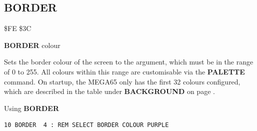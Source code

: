 
\newpage
\subsection{BORDER}
\begin{description}[leftmargin=2cm,style=nextline]
\item [Token:] \$FE \$3C
\item [Format:] {\bf BORDER} colour
\item [Usage:] Sets the border colour
               of the screen to the argument, which must be in the
               range of 0 to 255. All colours within this range are
               customisable via the {\bf PALETTE} command. On
               startup, the MEGA65 only has the first 32 colours configured,
               which are described in the table under {\bf BACKGROUND}
               on page \pageref{colourtable}.

\item [Example:] Using {\bf BORDER}
\begin{tcolorbox}[colback=black,coltext=white]
\verbatimfont{\codefont}
\begin{verbatim}
10 BORDER  4 : REM SELECT BORDER COLOUR PURPLE
\end{verbatim}
\end{tcolorbox}
\end{description}


\newpage
